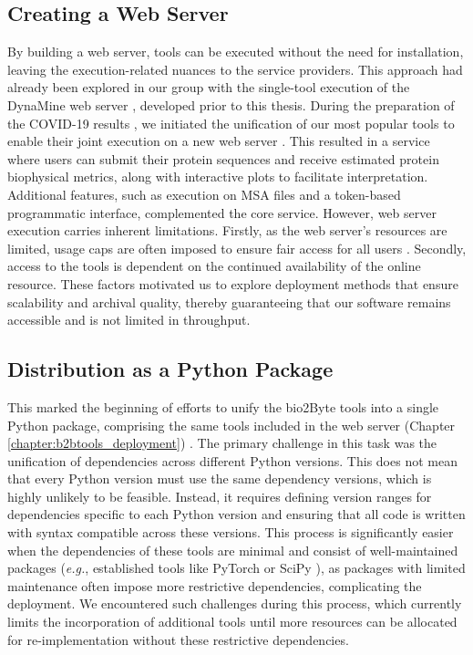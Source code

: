 \subsection{Creating a Web Server}

By building a web server, tools can be executed without the need for installation, leaving the execution-related nuances to the service providers. This approach had already been explored in our group with the single-tool execution of the DynaMine web server \cite{cilia_protein_2013, cilia_dynamine_2014}, developed prior to this thesis. During the preparation of the COVID-19 results \cite{kagami_online_2021}, we initiated the unification of our most popular tools to enable their joint execution on a new web server \cite{kagami_b2btools_2021}. This resulted in a service where users can submit their protein sequences and receive estimated protein biophysical metrics, along with interactive plots to facilitate interpretation. Additional features, such as execution on MSA files and a token-based programmatic interface, complemented the core service. However, web server execution carries inherent limitations. Firstly, as the web server's resources are limited, usage caps are often imposed to ensure fair access for all users \cite{abramson_accurate_2024, kagami_b2btools_2021}. Secondly, access to the tools is dependent on the continued availability of the online resource. These factors motivated us to explore deployment methods that ensure scalability and archival quality, thereby guaranteeing that our software remains accessible and is not limited in throughput.

\subsection{Distribution as a Python Package}

This marked the beginning of efforts to unify the bio2Byte tools into a single Python package, comprising the same tools included in the web server (Chapter \ref{chapter:b2btools_deployment}) \cite{gavalda-garcia_bio2byte_2024}. The primary challenge in this task was the unification of dependencies across different Python versions. This does not mean that every Python version must use the same dependency versions, which is highly unlikely to be feasible. Instead, it requires defining version ranges for dependencies specific to each Python version and ensuring that all code is written with syntax compatible across these versions. This process is significantly easier when the dependencies of these tools are minimal and consist of well-maintained packages (\textit{e.g.}, established tools like PyTorch \cite{paszke_pytorch_2019} or SciPy \cite{mckinney-proc-scipy-2010}), as packages with limited maintenance often impose more restrictive dependencies, complicating the deployment. We encountered such challenges during this process, which currently limits the incorporation of additional tools until more resources can be allocated for re-implementation without these restrictive dependencies.

